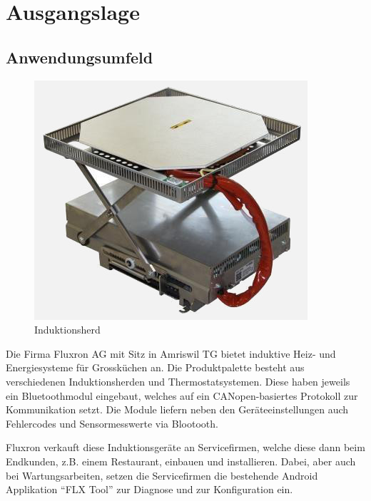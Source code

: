 
\section{Ausgangslage}
\label{sec:Ausgangslage}

\subsection{Anwendungsumfeld}
\label{subsec:Anwendungsumfeld}

\begin{figure}
  \begin{center}
  	\vspace{-20pt}
	\includegraphics[scale=0.4]{analysis/res/einbaugeraete}
	\caption{Induktionsherd}
	\vspace{-40pt}
  \end{center}
\end{figure}

Die Firma Fluxron AG mit Sitz in Amriswil TG bietet induktive Heiz- und Energiesysteme für Grossküchen an. Die Produktpalette besteht aus verschiedenen Induktionsherden und Thermostatsystemen. Diese haben jeweils ein Bluetoothmodul eingebaut, welches auf ein CANopen-basiertes Protokoll zur Kommunikation setzt. Die Module liefern neben den Geräteeinstellungen auch Fehlercodes und Sensormesswerte via Blootooth.

Fluxron verkauft diese Induktionsgeräte an Servicefirmen, welche diese dann beim Endkunden, z.B. einem Restaurant, einbauen und installieren. Dabei, aber auch bei Wartungsarbeiten, setzen die Servicefirmen die bestehende Android Applikation \enquote{FLX Tool} zur Diagnose und zur Konfiguration ein.

